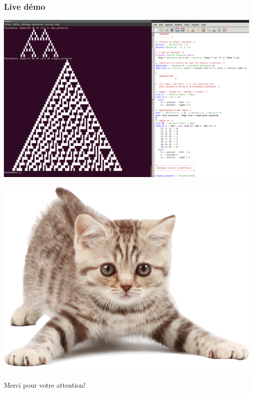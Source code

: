 \documentclass{beamer}
\begin{document}
\begin{frame}
\frametitle{Live démo}
\begin{center}
\includegraphics[scale=0.21]{live.png}
\end{center}
\end{frame}

\begin{frame}
\begin{center}
\includegraphics[scale=1]{chaton.png}
\end{center}
\begin{center}
Merci pour votre attention!
\end{center}

\end{frame}
\end{document}

